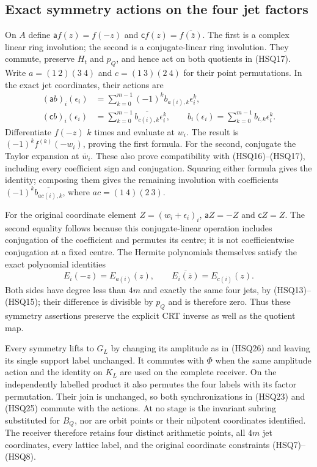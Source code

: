 \subsection{Exact symmetry actions on the four jet factors}

On $A$ define $\mathsf a f(z)=f(-z)$ and
$\mathsf c f(z)=\overline{f(\bar z)}$. The first is a complex
linear ring involution; the second is a conjugate-linear ring
involution. They commute, preserve $H_t$ and $p_Q$, and hence act
on both quotients in (HSQ17). Write
$a=(1\ 2)(3\ 4)$ and $c=(1\ 3)(2\ 4)$ for their point
permutations. In the exact jet coordinates, their actions are
\begin{equation}\tag{HSQ26}
 \begin{split}
 (\mathsf a b)_i(\epsilon_i)
   &=\sum_{k=0}^{m-1}(-1)^k b_{a(i),k}\epsilon_i^k,\\
 (\mathsf c b)_i(\epsilon_i)
   &=\sum_{k=0}^{m-1}\overline{b_{c(i),k}}\epsilon_i^k,
 \qquad b_i(\epsilon_i)=\sum_{k=0}^{m-1}b_{i,k}\epsilon_i^k.
 \end{split}
\end{equation}
Differentiate $f(-z)$ $k$ times and evaluate at $w_i$.
The result is $(-1)^kf^{(k)}(-w_i)$, proving the first formula.
For the second, conjugate the Taylor expansion at $\bar w_i$.
These also prove compatibility with (HSQ16)--(HSQ17), including
every coefficient sign and conjugation. Squaring either formula
gives the identity; composing them gives the remaining involution
with coefficients $(-1)^k\overline{b_{ac(i),k}}$, where
$ac=(1\ 4)(2\ 3)$.

For the original coordinate element $Z=(w_i+\epsilon_i)_i$,
$\mathsf aZ=-Z$ and $\mathsf cZ=Z$. The second equality follows
because this conjugate-linear operation includes conjugation of
the coefficient and permutes its centre; it is not coefficientwise
conjugation at a fixed centre. The Hermite polynomials themselves
satisfy the exact polynomial identities
\begin{equation}\tag{HSQ27}
 E_i(-z)=E_{a(i)}(z),\qquad
 \overline{E_i(\bar z)}=E_{c(i)}(z).
\end{equation}
Both sides have degree less than $4m$ and exactly the same four
jets, by (HSQ13)--(HSQ15); their difference is divisible by $p_Q$
and is therefore zero. Thus these symmetry assertions preserve the
explicit CRT inverse as well as the quotient map.

Every symmetry lifts to $G_L$ by changing its amplitude as in
(HSQ26) and leaving its single support label unchanged. It
commutes with $\Phi$ when the same amplitude action and the
identity on $K_L$ are used on the complete receiver. On the
independently labelled product it also permutes the four labels
with its factor permutation. Their join is unchanged, so both
synchronizations in (HSQ23) and (HSQ25) commute with the actions.
At no stage is the invariant subring substituted for $B_Q$, nor
are orbit points or their nilpotent coordinates identified.
The receiver therefore retains four distinct arithmetic points,
all $4m$ jet coordinates, every lattice label, and the original
coordinate constraints (HSQ7)--(HSQ8).
